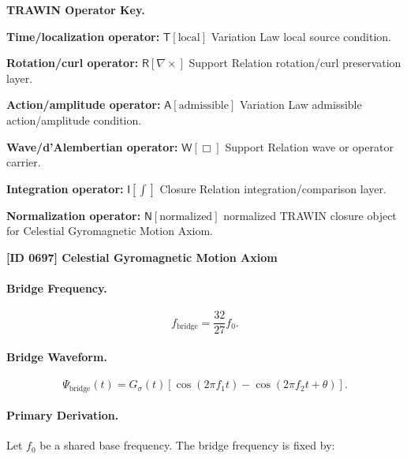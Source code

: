 \par\vspace{0.45\baselineskip}
\noindent\begin{minipage}[t]{\linewidth}
\begingroup
\small
\raggedright
\textbf{TRAWIN Operator Key.}\par
\noindent\textbf{Time/localization operator:} $\mathsf{T}\!\left[\mathrm{local}\right]$ Variation Law local source condition.\par
\noindent\textbf{Rotation/curl operator:} $\mathsf{R}\!\left[\nabla\times\right]$ Support Relation rotation/curl preservation layer.\par
\noindent\textbf{Action/amplitude operator:} $\mathsf{A}\!\left[\mathrm{admissible}\right]$ Variation Law admissible action/amplitude condition.\par
\noindent\textbf{Wave/d'Alembertian operator:} $\mathsf{W}\!\left[\Box\right]$ Support Relation wave or operator carrier.\par
\noindent\textbf{Integration operator:} $\mathsf{I}\!\left[\int\right]$ Closure Relation integration/comparison layer.\par
\noindent\textbf{Normalization operator:} $\mathsf{N}\!\left[\mathrm{normalized}\right]$ normalized TRAWIN closure object for Celestial Gyromagnetic Motion Axiom.\par
\endgroup
\end{minipage}

\clearpage
\noindent\textbf{[ID 0697] Celestial Gyromagnetic Motion Axiom}\par
\vspace{0.35em}
\paragraph{Bridge Frequency.}
\begin{equation}
f_{\mathrm{bridge}}=\frac{32}{27}f_0.
\end{equation}

\paragraph{Bridge Waveform.}
\begin{equation}
\Psi_{\mathrm{bridge}}(t)
=
G_{\sigma}(t)
\left[
\cos(2\pi f_1t)
-
\cos(2\pi f_2t+\theta)
\right].
\end{equation}

\paragraph{Primary Derivation.}
Let $f_0$ be a shared base frequency.  
The bridge frequency is fixed by:

